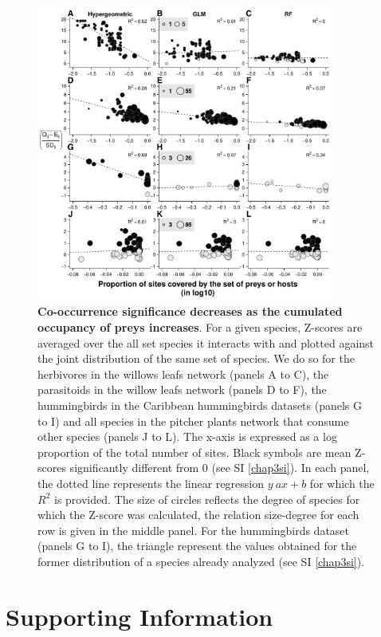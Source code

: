\begin{figure}
\centering
\includegraphics[width=0.87000\textwidth]{chapitre3/figdegocc.pdf}
\caption{\textbf{Co-occurrence significance decreases as the cumulated
occupancy of preys increases}. For a given species, Z-scores are
averaged over the all set species it interacts with and plotted against
the joint distribution of the same set of species. We do so for the
herbivores in the willows leafs network (panels A to C), the parasitoids
in the willow leafs network (panels D to F), the hummingbirds in the
Caribbean hummingbirds datasets (panels G to I) and all species in the
pitcher plants network that consume other species (panels J to L). The
x-axis is expressed as a log proportion of the total number of sites.
Black symbols are mean Z-scores significantly different from 0 (see SI
\ref{chap3si}). In each panel, the dotted line represents the linear
regression \(y~ax+b\) for which the \(R^2\) is provided. The size of
circles reflects the degree of species for which the Z-score was
calculated, the relation size-degree for each row is given in the middle
panel. For the hummingbirds dataset (panels G to I), the triangle
represent the values obtained for the former distribution of a species
already analyzed (see SI \ref{chap3si}).\label{fig:degocc}}
\end{figure}

\newpage

\section{Supporting Information}\label{supporting-information}

